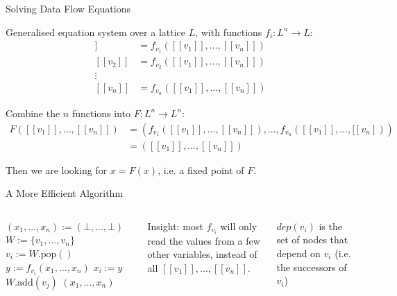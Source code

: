 \documentclass[aspectratio=169,xcolor=dvipsnames]{beamer}
\begin{document}

\begin{frame}{Solving Data Flow Equations}

	Generalised equation system over a lattice $L$, with functions $f_i: L^n
		\rightarrow L$:
	\begin{align*}
		[[v_1]] & = f_{v_1}([[v_1]], \ldots, [[v_n]]) \\
		[[v_2]] & = f_{v_2}([[v_1]], \ldots, [[v_n]]) \\
		\vdots                                        \\
		[[v_n]] & = f_{v_n}([[v_1]], \ldots, [[v_n]])
	\end{align*}

	Combine the $n$ functions into $F: L^n \rightarrow L^n$:
	\begin{align*}
		F([[v_1]], \ldots, [[v_n]]) & = (f_{v_1}([[v_1]], \ldots, [[v_n]]), \ldots, f_{v_n}([[v_1]], \ldots, [[v_n])) \\
		                            & = ([[v_1]], \ldots, [[v_n]])
	\end{align*}

	Then we are looking for $x = F(x)$, i.e. a fixed point of $F$.
\end{frame}


\begin{frame}[fragile]{A More Efficient Algorithm}
	\begin{columns}[c] %


		\begin{algorithm}[H]
			\footnotesize
			\begin{algorithmic}[1]
				\State $(x_1, \ldots, x_n) := (\bot, \ldots, \bot)$
				\State $W := \{v_1, \ldots, v_n\}$
				\State $v_i := W.\text{pop}()$
				\State $y := f_{v_i}(x_1, \ldots, x_n)$
				\State $x_i := y$
				\State $W.\text{add}(v_j)$
				\EndFor
				\EndIf
				\EndWhile
				\State \Return $(x_1, \ldots, x_n)$
				\EndProcedure
			\end{algorithmic}
			\caption{Simple Worklist Algorithm}
		\end{algorithm}


		Insight: most $f_{v_i}$ will only read the values from a few other variables,
		instead of all $[[v_1]], \ldots, [[v_n]]$.

		\bigskip

		$dep(v_i)$ is the set of nodes that depend on $v_i$ (i.e. the successors of $v_i$)
	\end{columns}
\end{frame}
\end{document}
